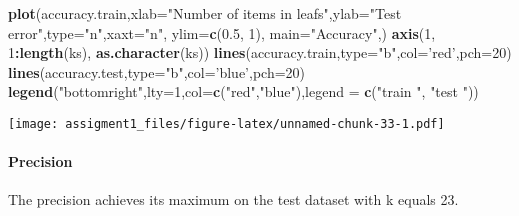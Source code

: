 \documentclass[
]{article}
\newenvironment{Shaded}{\begin{snugshade}}{\end{snugshade}}
\newcommand{\DataTypeTok}[1]{\textcolor[rgb]{0.13,0.29,0.53}{#1}}
\newcommand{\DecValTok}[1]{\textcolor[rgb]{0.00,0.00,0.81}{#1}}
\newcommand{\FloatTok}[1]{\textcolor[rgb]{0.00,0.00,0.81}{#1}}
\newcommand{\KeywordTok}[1]{\textcolor[rgb]{0.13,0.29,0.53}{\textbf{#1}}}
\newcommand{\NormalTok}[1]{#1}
\newcommand{\OperatorTok}[1]{\textcolor[rgb]{0.81,0.36,0.00}{\textbf{#1}}}
\newcommand{\StringTok}[1]{\textcolor[rgb]{0.31,0.60,0.02}{#1}}
\begin{document}
\begin{Shaded}
\begin{Highlighting}[]
\KeywordTok{plot}\NormalTok{(accuracy.train,}\DataTypeTok{xlab=}\StringTok{"Number of items in leafs"}\NormalTok{,}\DataTypeTok{ylab=}\StringTok{"Test error"}\NormalTok{,}\DataTypeTok{type=}\StringTok{"n"}\NormalTok{,}\DataTypeTok{xaxt=}\StringTok{"n"}\NormalTok{, }\DataTypeTok{ylim=}\KeywordTok{c}\NormalTok{(}\FloatTok{0.5}\NormalTok{, }\DecValTok{1}\NormalTok{),  }\DataTypeTok{main=}\StringTok{"Accuracy"}\NormalTok{,)}
\KeywordTok{axis}\NormalTok{(}\DecValTok{1}\NormalTok{, }\DecValTok{1}\OperatorTok{:}\KeywordTok{length}\NormalTok{(ks), }\KeywordTok{as.character}\NormalTok{(ks))}
\KeywordTok{lines}\NormalTok{(accuracy.train,}\DataTypeTok{type=}\StringTok{"b"}\NormalTok{,}\DataTypeTok{col=}\StringTok{'red'}\NormalTok{,}\DataTypeTok{pch=}\DecValTok{20}\NormalTok{)}
\KeywordTok{lines}\NormalTok{(accuracy.test,}\DataTypeTok{type=}\StringTok{"b"}\NormalTok{,}\DataTypeTok{col=}\StringTok{'blue'}\NormalTok{,}\DataTypeTok{pch=}\DecValTok{20}\NormalTok{)}
\KeywordTok{legend}\NormalTok{(}\StringTok{"bottomright"}\NormalTok{,}\DataTypeTok{lty=}\DecValTok{1}\NormalTok{,}\DataTypeTok{col=}\KeywordTok{c}\NormalTok{(}\StringTok{"red"}\NormalTok{,}\StringTok{"blue"}\NormalTok{),}\DataTypeTok{legend =} \KeywordTok{c}\NormalTok{(}\StringTok{"train "}\NormalTok{, }\StringTok{"test "}\NormalTok{))}
\end{Highlighting}
\end{Shaded}

\texttt{[image: assigment1\_files/figure-latex/unnamed-chunk-33-1.pdf]}

\hypertarget{precision-1}{%
\paragraph{Precision}\label{precision-1}}

The precision achieves its maximum on the test dataset with k equals 23.
\end{document}
